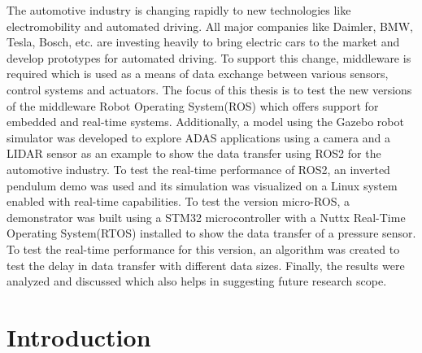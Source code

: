 \documentclass[%
xelatex,
	oneside,		%
	12pt,			%
	parskip=half,	%
	abstracton,
	chapterprefix=true%
    appendixprefix=true]
{scrbook}
\begin{document}
The automotive industry is changing rapidly to new technologies like electromobility and automated driving. All major companies like Daimler, BMW, Tesla, Bosch, etc. are investing heavily to bring electric cars to the market and develop prototypes for automated driving. To support this change, middleware is required which is used as a means of data exchange between various sensors, control systems and actuators. The focus of this thesis is to test the new versions of the middleware Robot Operating System(ROS) which offers support for embedded and real-time systems. Additionally, a model using the Gazebo robot simulator was developed to explore ADAS applications using a camera and a LIDAR sensor as an example to show the data transfer using ROS2 for the automotive industry. To test the real-time performance of ROS2, an inverted pendulum demo was used and its simulation was visualized on a Linux system enabled with real-time capabilities. To test the version micro-ROS, a demonstrator was built using a STM32 microcontroller with a Nuttx Real-Time Operating System(RTOS) installed to show the data transfer of a pressure sensor. To test the real-time performance for this version, an algorithm was created to test the delay in data transfer with different data sizes. Finally, the results were analyzed and discussed which also helps in suggesting future research scope.
\clearpage

	
\rofoot[\pagemark]{\pagemark}
\printnomenclature
	

	\tableofcontents
	
	


	\chapter{Introduction}

\rofoot[\pagemark]{\pagemark}
\end{document}
